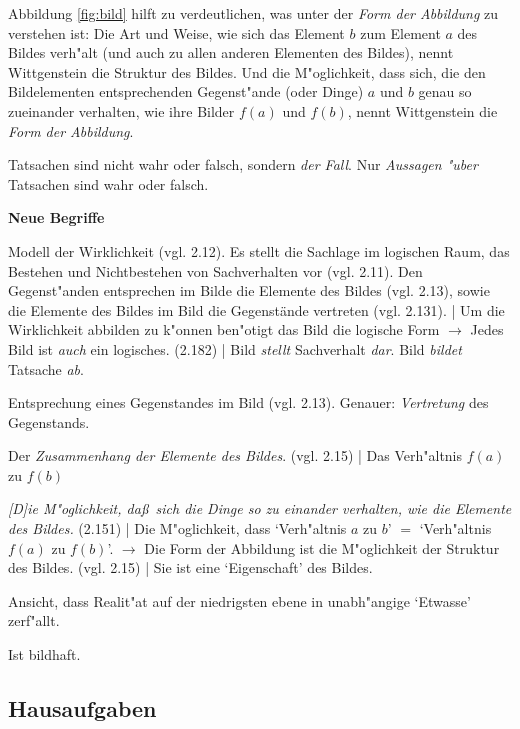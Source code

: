 \documentclass[]{scrartcl}
\begin{document}
Abbildung \ref{fig:bild} hilft zu verdeutlichen, was unter der \emph{Form der Abbildung} zu verstehen ist: Die Art und Weise, wie sich das Element $b$ zum Element $a$ des Bildes verh"alt (und auch zu allen anderen Elementen des Bildes), nennt Wittgenstein die Struktur des Bildes. Und die M"oglichkeit, dass sich, die den Bildelementen entsprechenden Gegenst"ande (oder Dinge) $a$ und $b$ genau so zueinander verhalten, wie ihre Bilder $f(a)$ und $f(b)$, nennt Wittgenstein die \emph{Form der Abbildung}.

Tatsachen sind nicht wahr oder falsch, sondern \emph{der Fall}. Nur \emph{Aussagen "uber} Tatsachen sind wahr oder falsch.

\vspace{10pt}
\noindent \textbf{Neue Begriffe}

\begin{description}[leftmargin=!,labelwidth=\widthof{\bfseries Form der Abbildun}]
  \item[Bild] Modell der Wirklichkeit (vgl. 2.12). Es stellt die Sachlage im logischen Raum, das Bestehen und Nichtbestehen von Sachverhalten vor (vgl. 2.11). Den Gegenst"anden entsprechen im Bilde die Elemente des Bildes (vgl. 2.13), sowie die Elemente des Bildes im Bild die Gegenstände vertreten (vgl. 2.131). | Um die Wirklichkeit abbilden zu k"onnen ben"otigt das Bild die logische Form $\rightarrow$ Jedes Bild ist \emph{auch} ein logisches. (2.182) | Bild \emph{stellt} Sachverhalt \emph{dar}. Bild \emph{bildet} Tatsache \emph{ab}.
  \item[Element des Bildes] Entsprechung eines Gegenstandes im Bild (vgl. 2.13). Genauer: \emph{Vertretung} des Gegenstands.
  \item[Struktur des Bildes] Der \emph{Zusammenhang der Elemente des Bildes}. (vgl. 2.15) | Das Verh"altnis $f(a)$ zu $f(b)$
  \item[Form der Abbildung] \emph{[D]ie M"oglichkeit, da\ss~sich die Dinge so zu einander verhalten, wie die Elemente des Bildes.} (2.151) | Die M"oglichkeit, dass `Verh"altnis $a$ zu $b$' $=$ `Verh"altnis $f(a)$ zu $f(b)$'. $\rightarrow$ Die Form der Abbildung ist die M"oglichkeit der Struktur des Bildes. (vgl. 2.15) | Sie ist eine `Eigenschaft' des Bildes.
  \item[Log. Atomismus] Ansicht, dass Realit"at auf der niedrigsten ebene in unabh"angige `Etwasse' zerf"allt.
  \item[Sprache] Ist bildhaft.
\end{description}


\subsection{Hausaufgaben}
\end{document}
